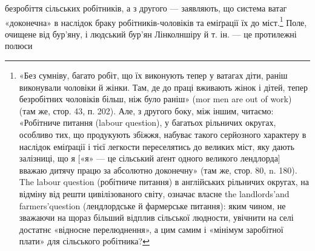 безробіття сільських робітників, а з другого — заявляють, що
система ватаг «доконечна» в наслідок браку робітників-чоловіків
та еміґрації їх до міст.\footnote{
«Без сумніву, багато робіт, що їх виконують тепер у ватагах
діти, раніш виконували чоловіки й жінки. Там, де до праці вживають
жінок і дітей, тепер безробітних чоловіків більш, ніж було раніш» (mor
men are out of work) (там же, стор. 43, п. 202). Але, з другого боку, між
іншим, читаємо: «Робітниче питання (labour question), у багатьох рільничих
округах, особливо тих, що продукують збіжжя, набуває такого
серйозного характеру в наслідок еміґрації і тієї легкости переселятись
до великих міст, яку дають залізниці, що я [«я» — це сільський аґент
одного великого лендлорда] вважаю дитячу працю за абсолютно доконечну»
(там же, стор. 80, n. 180). The labour question (робітниче питання)
в англійських рільничих округах, на відміну від решти цивілізованого
світу, означає власне the landlords’and farmers’question (лендлордське
й фармерське питання): яким чином, не зважаючи на щораз більший
відплив сільської людности, увічнити на селі достатнє «відносне перелюднення»,
а цим самим і «мінімум заробітної плати» для сільського
робітника?
} Поле, очищене від бур’яну, і людський
бур’ян Лінколншіру й т. ін. — це протилежні полюси
